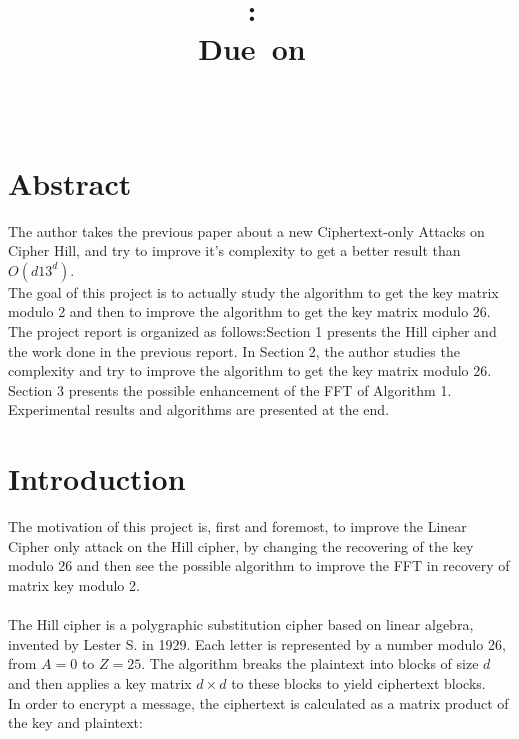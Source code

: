\documentclass{article}
\title{
\vspace{2in}
\textmd{\textbf{\hmwkClass:\ \hmwkTitle}}\\
\normalsize\vspace{0.1in}\small{Due\ on\ \hmwkDueDate}\\
\vspace{0.1in}\large{\textit{\hmwkClassInstructor\ \hmwkClassTime}}
\vspace{3in}
}
\author{\textbf{\hmwkAuthorName}}
\date{} %
\begin{document}
\maketitle


\newpage
\section*{Abstract}
The author takes the previous paper about a new Ciphertext-only Attacks on Cipher Hill, and try to improve it's complexity to get a better result than $O(d13^d)$.\\
${}$\hspace{1em}The goal of this project is to actually study the algorithm to get the key matrix modulo 2 and then to improve the algorithm to get the key matrix modulo 26.\\
${}$\hspace{1em}The project report is organized as follows:Section 1 presents the Hill cipher and the work done in the previous report. In Section 2, the author studies the complexity and try to improve the algorithm to get the key matrix modulo 26. Section 3 presents the possible enhancement of the FFT of Algorithm 1. Experimental results and algorithms are presented at the end.

\newpage
\tableofcontents
\newpage



\section{Introduction}
The motivation of this project is, first and foremost, to improve the Linear Cipher only attack on the Hill cipher, by changing the recovering of the key modulo 26 and then see the possible algorithm to improve the FFT in recovery of matrix key modulo 2.\\
\\
The Hill cipher is a polygraphic substitution cipher based on linear algebra, invented by Lester S. in 1929. Each letter is represented by a number modulo 26, from $A=0$ to $Z=25$. The algorithm breaks the plaintext into blocks of size $d$ and then applies a key matrix $d \times d $ to these blocks to yield ciphertext blocks.\\
In order to encrypt a message, the ciphertext is calculated as a matrix product of the key and plaintext:
\end{document}
